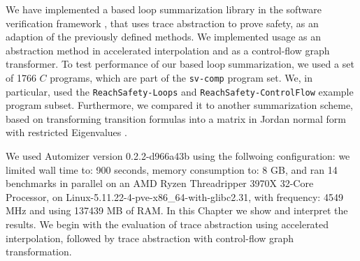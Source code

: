 
We have implemented a \qvasr based loop summarization library in the software verification framework \ultimate, that uses trace abstraction to prove safety, as an adaption of the previously defined methods. We implemented \qvasr usage as an abstraction method in  accelerated interpolation and as a control-flow graph transformer. To test performance of our \qvasr based loop summarization, we used a set of 1766 $C$ programs, which are part of the \texttt{sv-comp} \cite{svcomp} program set. We, in particular, used the \texttt{ReachSafety-Loops} and \texttt{ReachSafety-ControlFlow} example program subset. Furthermore, we compared it to another summarization scheme, based on transforming transition formulas into a matrix in Jordan normal form with restricted Eigenvalues \cite{DBLP:conf/popl/JeannetSS14}. \par
We used \ultimate Automizer version 0.2.2-d966a43b using the follwoing configuration: we limited wall time to: 900 seconds, memory consumption to: 8 GB, and ran 14 benchmarks in parallel on an AMD Ryzen Threadripper 3970X 32-Core Processor, on Linux-5.11.22-4-pve-x86\_64-with-glibc2.31, with frequency: 4549 MHz and using 137439 MB of RAM. In this Chapter we show and interpret the results. We begin with the evaluation of trace abstraction using accelerated interpolation, followed by trace abstraction with control-flow graph transformation.

